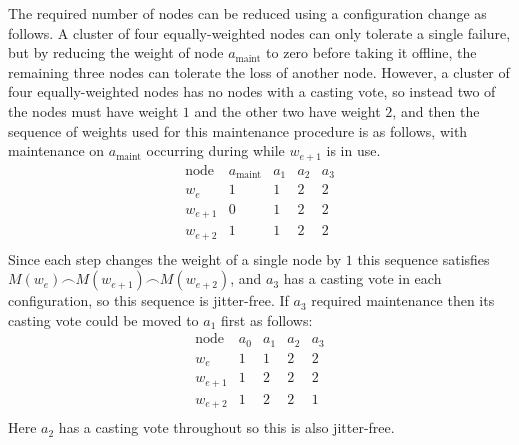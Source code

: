 \documentclass[journal]{IEEEtran}
\begin{document}
The required number of nodes can be reduced using a configuration change as
follows. A cluster of four equally-weighted nodes can only tolerate a single
failure, but by reducing the weight of node $a_{\textrm{maint}}$ to zero before
taking it offline, the remaining three nodes can tolerate the loss of another
node. However, a cluster of four equally-weighted nodes has no nodes with a
casting vote, so instead two of the nodes must have weight $1$ and the other
two have weight $2$, and then the sequence of weights used for this maintenance
procedure is as follows, with maintenance on $a_{\textrm{maint}}$ occurring
during while $w_{e+1}$ is in use.
\[\begin{array}{rcccc}
\textrm{node}&a_{\textrm{maint}}&a_1&a_2&a_3 \\
w_e&1&1&2&2\\
w_{e+1}&0&1&2&2\\
w_{e+2}&1&1&2&2\\
\end{array}\]
Since each step changes the weight of a single node by $1$ this sequence
satisfies $M(w_e) \frown M(w_{e+1}) \frown M(w_{e+2})$, and $a_3$ has a casting
vote in each configuration, so this sequence is jitter-free.  If $a_3$ required
maintenance then its casting vote could be moved to $a_1$ first as follows:
\[\begin{array}{rcccc}
\textrm{node}&a_0&a_1&a_2&a_3 \\
w_e&1&1&2&2\\
w_{e+1}&1&2&2&2\\
w_{e+2}&1&2&2&1\\
\end{array}\]
Here $a_2$ has a casting vote throughout so this is also jitter-free.
\end{document}
